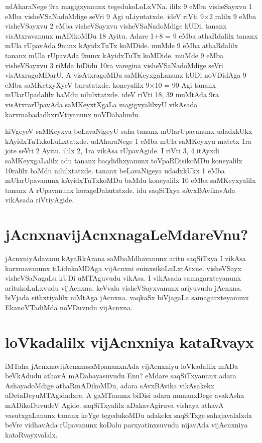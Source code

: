 udAharaNege 9ra magigxyanunx tegedukoLoLxVNa. ililx 9 eMba visheSayxvu 1 eMba visheVSaNadoMdige seVri 9 Agi uLiyutatxde. ideV riVti 9$\times$2 ralilx 9 eMba visheVSayxvu 2 eMba visheVSayxvu visheVSaNadoMdige kUDi, tananx visAtxravanunx mADikoMDu 18 Ayitu. Adare 1$+$8 = 9 eMba athaRdalilx tananx mUla rUpavAda 9nunx kAyidxTuTx koMDide. muMde 9 eMba athaRdalilx tananx mUla rUpavAda 9nunx kAyidxTuTx koMDide. muMde 9 eMba visheVSayxvu 3 riMda hiDidu 10ra varegina visheVSaNadoMdige seVri visAtxragoMDarU, A visAtxragoMDa saMKeyxgaLanunx kUDi noVDidAga 9 eMba saMKetxyXyeV barutatxde. koneyalilx 9$\times$10 = 90 Agi tananx mUlarUpadalilx baMdu nilulxtatxde. ideV riVti 18, 39 muMtAda 9ra visAtxrarUpavAda saMKeyxtXgaLa magigxyalilxyU vikAsada karxmabadadhxriVtiyanunx noVDabahudu.

hiVgeyeV saMKeyxya beLavaNigeyU saha tananx mUlarUpavanunx udadxkUkx kAyidxTuTxkoLuLxtatxde. udAharaNege 1 eMba mUla saMKeyxyu matetx 1ra jote seVri 2 Ayitu. ililx 2, 1ra vikAsa rUpavAgide. I riVti 3, 4 itAyxdi saMKeyxgaLalilx adu tananx baqdidhxyanunx toVpaRDisikoMDu koneyalilx 10ralilx baMdu nilulxtatxde. tananx beLavaNigeya udadxkUkx 1 eMba mUlarUpavanunx kAyidxTuTxkoMDu baMdu koneyalilx 10 eMba saMKeyxyalilx tananx A rUpavanunx  horageDahutatxde. idu saqSiTxya sAvxBAvikavAda vikAsada riVtiyAgide.

\section*{jAcnxnavijAcnxnagaLeMdareVnu?}

jAcnxniyAdavanu kAyaRkArana saMbaMdhavanunx aritu saqSiTxya I vikAsa karxmavanunx tiLidukoMDAga vijAcnxni eninxsikoLuLxtAtxne. visheVSayx visheVSaNagaLu kUDi uMTAguvudu vikAsa. I vikAsada samagarxteyanunx aritukoLuLxvudu vijAcnxna. keVvala visheVSayxvanunx ariyuvudu jAcnxna. biVjada sithxtiyalilx niMtAga jAcnxna. vaqkaSx biVjagaLa samagarxteyanunx EkanoVTadiMda noVDuvudu vijAcnxna.

\section*{loVkadalilx vijAcnxniya kataRvayx}

iMTaha jAcnxnavijAcnxnasaMpananxnAda vijAcnxniyu loVkadalilx mADa beVkAdudu athavA mADabayasuvudu Enu? eMdare saqSiTxyanunx adara AshayadoMdige athaRmADikoMDu, adara sAvxBAvika vikAsakekx aDetaDeyuMTAgidadxre, A gaMTanunx biDisi adara munanxDege avakAsha mADikoDuvudeV Agide. saqSiTxyalilx aDakavAgiruva vishaya athavA vasutxgaLanunx tananx keYge tegedukoMDu adakekx saqSiTxge sahajavalalxda beVre vidhavAda rUpavanunx koDalu parxyatinxsuvudu nijavAda vijAcnxniya kataRvayxvalalx.

